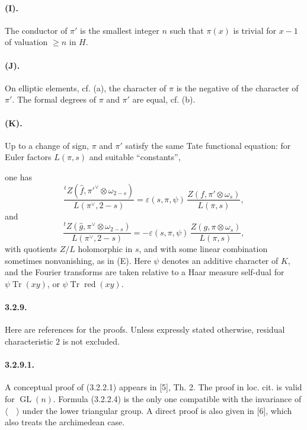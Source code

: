 \documentclass[10pt,a4paper]{article}
\providecommand{\GL}{\operatorname{GL}}
\providecommand{\Tr}{\operatorname{Tr}}
\providecommand{\red}{\operatorname{red}}
\begin{document}
\paragraph{(I).} The conductor of \(\pi'\) is the smallest integer \(n\) such that \(\pi(x)\) is trivial for \(x-1\) of valuation \(\ge n\) in \(H\).

\paragraph{(J).} On elliptic elements, cf. (a), the character of \(\pi\) is the negative of the character of \(\pi'\). The formal degrees of \(\pi\) and \(\pi'\) are equal, cf. (b).

\paragraph{(K).} Up to a change of sign, \(\pi\) and \(\pi'\) satisfy the same Tate functional equation: for Euler factors \(L(\pi,s)\) and suitable ``constants'',

\clearpage
{}
\hypertarget{authority-49}{}
one has
\[
\frac{{}^{t}Z(\widehat f,\pi'^{\vee}\otimes\omega_{2-s})}{L(\pi^{\vee},2-s)}
=
\varepsilon(s,\pi,\psi)\,
\frac{Z(f,\pi'\otimes\omega_s)}{L(\pi,s)},
\]
and
\[
\frac{{}^{t}Z(\widehat g,\pi^{\vee}\otimes\omega_{2-s})}{L(\pi^{\vee},2-s)}
=-\varepsilon(s,\pi,\psi)\,
\frac{Z(g,\pi\otimes\omega_s)}{L(\pi,s)},
\]
with quotients \(Z/L\) holomorphic in \(s\), and with some linear combination sometimes nonvanishing, as in (E). Here \(\psi\) denotes an additive character of \(K\), and the Fourier transforms are taken relative to a Haar measure self-dual for \(\psi\Tr(xy)\), or \(\psi\Tr\red(xy)\).

\paragraph{3.2.9.} Here are references for the proofs. Unless expressly stated otherwise, residual characteristic \(2\) is not excluded.

\paragraph{3.2.9.1.} A conceptual proof of (3.2.2.1) appears in [5], Th. 2. The proof in loc. cit. is valid for \(\GL(n)\). Formula (3.2.2.4) is the only one compatible with the invariance of \(\langle\quad\rangle\) under the lower triangular group. A direct proof is also given in [6], which also treats the archimedean case.
\end{document}
